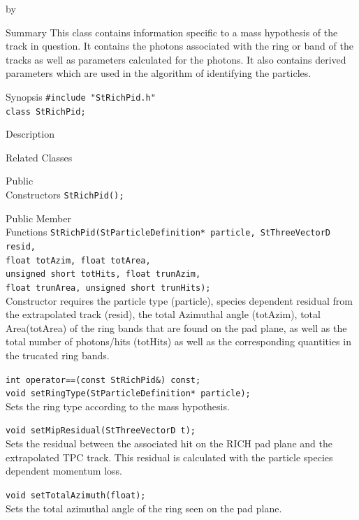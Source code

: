 \documentclass[twoside]{article}
\newcommand{\entrylabel}[1]{\mbox{\textbf{{#1}}}\hfil}%
\newenvironment{entry}
{\begin{list}{}%
    {\renewcommand{\makelabel}{\entrylabel}%
     \setlength{\labelwidth}{90pt}%
     \setlength{\leftmargin}{\labelwidth}
     \advance\leftmargin by \labelsep%
      }%
    }%
  {\end{list}}
\newcommand{\Entrylabel}[1]%
{\raisebox{0pt}[1ex][0pt]{\makebox[\labelwidth][l]%
    {\parbox[t]{\labelwidth}{\hspace{0pt}\textbf{{#1}}}}}}
\newenvironment{Entry}%
{\renewcommand{\entrylabel}{\Entrylabel}\begin{entry}}%
  {\end{entry}}
\begin{document}
\begin{Entry}
\item[Summary] This class contains information specific
    to a mass hypothesis of the track in question.  It
    contains the photons associated with the ring or
    band of the tracks as well as parameters calculated
    for the photons.  It also contains derived parameters
    which are used in the algorithm of identifying the
    particles.
\item[Synopsis]
    \verb+#include "StRichPid.h"+\\
    \verb+class StRichPid;+\\
\item[Description]
\item[Related Classes]
\item[Public\\ Constructors]
    \verb+StRichPid();+\\
\item[Public Member\\ Functions]
    \verb+StRichPid(StParticleDefinition* particle, StThreeVectorD resid,+\\
    \verb+float totAzim, float totArea,+\\
    \verb+unsigned short totHits, float trunAzim,+\\
    \verb+float trunArea, unsigned short trunHits);+\\
    Constructor requires the particle type (particle),
    species dependent residual from the extrapolated
    track (resid), the total Azimuthal angle (totAzim),
    total Area(totArea) of the ring bands that are found
    on the pad plane, as well as the total number of
    photons/hits (totHits) as well as the corresponding
    quantities in the trucated ring bands.

    \verb+int operator==(const StRichPid&) const;+\\

    \verb+void setRingType(StParticleDefinition* particle);+\\
    Sets the ring type according to the mass hypothesis.
    
    \verb+void setMipResidual(StThreeVectorD t);+\\
    Sets the residual between the associated hit on the
    RICH pad plane and the extrapolated TPC track.  This
    residual is calculated with the particle species dependent
    momentum loss.
    
    \verb+void setTotalAzimuth(float);+\\
    Sets the total azimuthal angle of the ring
    seen on the pad plane.
    

\end{Entry}
\end{document}
